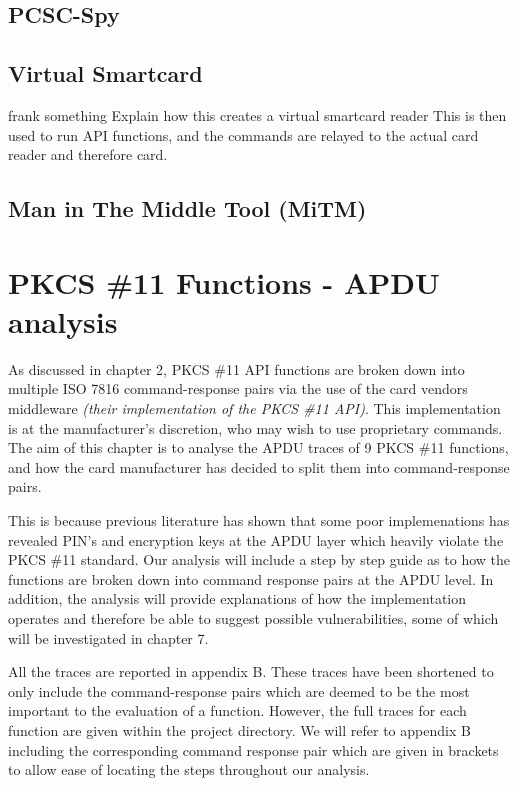 \documentclass[bsc,frontabs,twoside,singlespacing,parskip,deptreport]{infthesis}     %
\begin{document}
\section{PCSC-Spy}

\section{Virtual Smartcard}
frank something
Explain how this creates a virtual smartcard reader
This is then used to run API functions, and the commands are relayed to the actual card reader and therefore card.


\section{Man in The Middle Tool (MiTM)}




\chapter{PKCS \#11 Functions - APDU analysis}

As discussed in chapter 2, PKCS \#11 API functions are broken down into multiple ISO 7816 command-response pairs via the use of the card vendors middleware \textit{(their implementation of the PKCS \#11 API)}. This implementation is  at the manufacturer's discretion, who may wish to use proprietary commands. The aim of this chapter is to analyse the APDU traces of 9 PKCS \#11 functions, and how the card manufacturer has decided to split them into command-response pairs. 

This is because previous literature has shown that some poor implemenations has revealed PIN's and encryption keys at the APDU layer which heavily violate the PKCS \#11 standard. Our analysis will include a step by step guide as to how the functions are broken down into command response pairs at the APDU level.  In addition, the analysis will provide explanations of how the implementation operates and therefore be able to suggest possible vulnerabilities, some of which will be investigated in chapter 7. 

All the traces are reported in appendix B. These traces have been shortened to only include the command-response pairs which are deemed to be the most important to the evaluation of a function. However, the full traces for each function are given within the project directory. We will refer to appendix B including the corresponding command response pair which are given in brackets to allow ease of locating the steps throughout our analysis.
\end{document}
